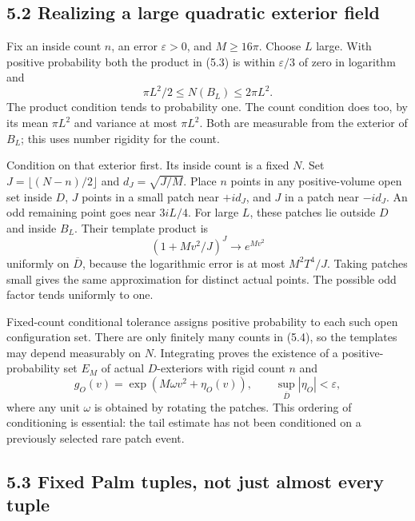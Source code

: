 \documentclass[11pt,a4paper]{article}
\theoremstyle{definition}
\theoremstyle{remark}
\numberwithin{equation}{section}
\begin{document}
\hypertarget{realizing-a-large-quadratic-exterior-field}{%
\subsection{5.2 Realizing a large quadratic exterior field}\label{realizing-a-large-quadratic-exterior-field}}

Fix an inside count \(n\), an error \(\varepsilon>0\), and \(M\ge16\pi\). Choose \(L\) large. With positive probability both the product in (5.3) is within \(\varepsilon/3\) of zero in logarithm and \[
\pi L^2/2\le N(B_L)\le2\pi L^2.
\tag{5.4}
\] The product condition tends to probability one. The count condition does too, by its mean \(\pi L^2\) and variance at most \(\pi L^2\). Both are measurable from the exterior of \(B_L\); this uses number rigidity for the count.

Condition on that exterior first. Its inside count is a fixed \(N\). Set \(J=\lfloor(N-n)/2\rfloor\) and \(d_J=\sqrt{J/M}\). Place \(n\) points in any positive-volume open set inside \(D\), \(J\) points in a small patch near \(+id_J\), and \(J\) in a patch near \(-id_J\). An odd remaining point goes near \(3iL/4\). For large \(L\), these patches lie outside \(D\) and inside \(B_L\). Their template product is \[
(1+Mv^2/J)^J\longrightarrow e^{Mv^2}
\] uniformly on \(\overline D\), because the logarithmic error is at most \(M^2T^4/J\). Taking patches small gives the same approximation for distinct actual points. The possible odd factor tends uniformly to one.

Fixed-count conditional tolerance assigns positive probability to each such open configuration set. There are only finitely many counts in (5.4), so the templates may depend measurably on \(N\). Integrating proves the existence of a positive-probability set \(E_M\) of actual \(D\)-exteriors with rigid count \(n\) and \[
g_O(v)=\exp(M\omega v^2+\eta_O(v)),\qquad
\sup_{\overline D}|\eta_O|<\varepsilon,
\tag{5.5}
\] where any unit \(\omega\) is obtained by rotating the patches. This ordering of conditioning is essential: the tail estimate has not been conditioned on a previously selected rare patch event.

\hypertarget{fixed-palm-tuples-not-just-almost-every-tuple}{%
\subsection{5.3 Fixed Palm tuples, not just almost every tuple}\label{fixed-palm-tuples-not-just-almost-every-tuple}}
\end{document}
